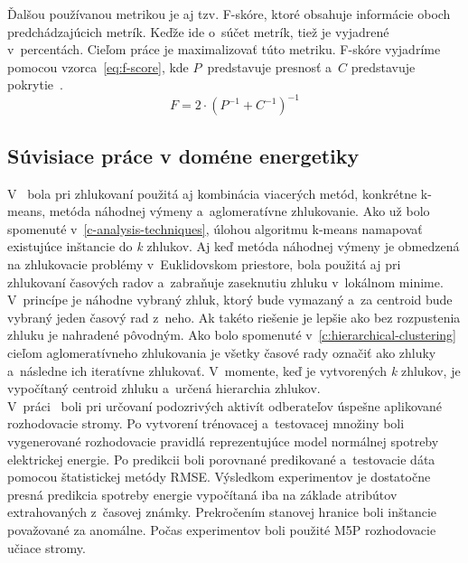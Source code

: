 \documentclass[a4paper,twoside,slovak,12pt,appendix]{article}
\begin{document}
Ďalšou používanou metrikou je aj tzv. F-skóre, ktoré obsahuje informácie oboch
predchádzajúcich metrík. Keďže ide o~súčet metrík, tiež je vyjadrené
v~percentách. Cieľom práce je maximalizovať túto metriku. F-skóre vyjadríme
pomocou vzorca~\ref{eq:f-score}, kde $P$~predstavuje presnosť a~$C$ predstavuje
pokrytie~\cite{Trevizan2015}.
\begin{equation}
	\label{eq:f-score}
  F = 2 \cdot \left( P^{-1} + C^{-1} \right)^{-1}
\end{equation}


\subsection{Súvisiace práce v doméne energetiky}
V~\cite{Hautamaki2008} bola pri zhlukovaní použitá aj kombinácia viacerých
metód, konkrétne k-means, metóda náhodnej výmeny a~aglomeratívne zhlukovanie.
Ako už bolo spomenuté v~\ref{c-analysis-techniques}, úlohou algoritmu k-means
namapovať existujúce inštancie do \textit{k} zhlukov. Aj keď metóda náhodnej
výmeny je obmedzená na zhlukovacie problémy v~Euklidovskom priestore, bola
použitá aj pri zhlukovaní časových radov a~zabraňuje zaseknutiu zhluku
v~lokálnom minime. V~princípe je náhodne vybraný zhluk, ktorý bude vymazaný a~za
centroid bude vybraný jeden časový rad z~neho. Ak takéto riešenie je lepšie ako
bez rozpustenia zhluku je nahradené pôvodným. Ako bolo spomenuté
v~\ref{c:hierarchical-clustering} cieľom aglomeratívneho zhlukovania je všetky
časové rady označiť ako zhluky a~následne ich iteratívne zhlukovať. V~momente,
keď je vytvorených \textit{k} zhlukov, je vypočítaný centroid zhluku a~určená
hierarchia zhlukov.\\

V~práci~\cite{Cody2015} boli pri určovaní podozrivých aktivít odberateľov
úspešne aplikované rozhodovacie stromy. Po vytvorení trénovacej a~testovacej
množiny boli vygenerované rozhodovacie pravidlá reprezentujúce model normálnej
spotreby elektrickej energie. Po predikcii boli porovnané predikované
a~testovacie dáta pomocou štatistickej metódy RMSE. Výsledkom experimentov je
dostatočne presná predikcia spotreby energie vypočítaná iba na základe atribútov
extrahovaných z~časovej známky. Prekročením stanovej hranice boli inštancie
považované za anomálne.  Počas experimentov boli použité M5P rozhodovacie učiace
stromy.\\
\end{document}
